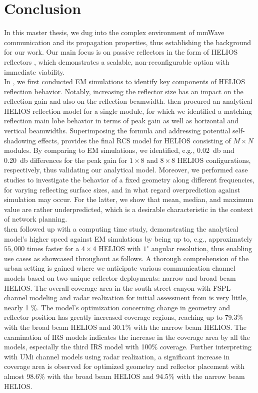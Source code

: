 \chapter{Conclusion}\label{Conclusion}
In this master thesis, we dug into the complex environment of mmWave communication and its propagation properties, thus establishing the background for our work. Our main focus is on passive reflectors in the form of HELIOS reflectors \cite{Helios}, which demonstrates a scalable, non-reconfigurable option with immediate viability.\\
In , we first conducted EM simulations to identify key components of HELIOS reflection behavior. Notably, increasing the reflector size has an impact on the reflection gain and also on the reflection beamwidth.  then procured an analytical HELIOS reflection model for a single module, for which we identified a matching reflection main lobe behavior in terms of peak gain as well as horizontal and vertical beamwidths. Superimposing the formula and addressing potential self-shadowing effects,  provides the final RCS model for HELIOS consisting of $M \times N$ modules. By comparing to EM simulations, we identified, e.g., \SI{0.02}{\decibel} and \SI{0.20}{\decibel} differences for the peak gain for $1 \times 8$ and $8 \times 8$ HELIOS configurations, respectively, thus validating our analytical model. Moreover, we performed case studies to investigate the behavior of a fixed geometry along different frequencies, for varying reflecting surface sizes, and in what regard overprediction against simulation may occur. For the latter, we show that mean, median, and maximum value are rather underpredicted, which is a desirable characteristic in the context of network planning.\\
 then followed up with a computing time study, demonstrating the analytical model’s higher speed against EM simulations by being up to, e.g., approximately $55,000$ times faster for a $4\times4$ HELIOS with  $1^\circ$ angular resolution, thus enabling use cases as showcased throughout  as follows. A thorough comprehension of the urban setting is gained where we anticipate various communication channel models based on two unique reflector deployments: narrow and broad beam HELIOS. The overall coverage area in the south street canyon with FSPL channel modeling and radar realization for initial assessment from \cite{Helios} is very little, nearly \num{1} \%. The model's optimization concerning change in geometry and reflector position has greatly increased coverage regions, reaching up to 79.3\% with the broad beam HELIOS and 30.1\% with the narrow beam HELIOS. The examination of IRS models indicates the increase in the coverage area by all the models, especially the third IRS model  with 100\% coverage. Further interpreting with UMi channel models using radar realization, a significant increase in coverage area is observed for optimized geometry and reflector placement with almost 98.6\% with the broad beam HELIOS and 94.5\% with the narrow beam HELIOS.
